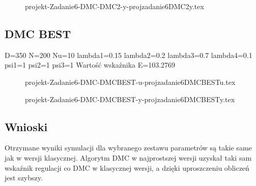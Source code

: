 \ifdefined\CompileFigures
    \begin{figure}[H] 
            \centering
            
            \caption{projekt-Zadanie6-DMC-DMC2-y-projzadanie6DMC2y.tex}
            \label{projekt:zad6:figure:projzadanie6DMC2y}
    \end{figure}
\fi

\subsection{DMC BEST}
D=350 N=200 Nu=10 
lambda1=0.15 lambda2=0.2 lambda3=0.7 lambda4=0.1 
psi1=1 psi2=1 psi3=1 
Wartość wskaźnika E=103.2769


\ifdefined\CompileFigures
    \begin{figure}[H] 
            \centering
            
            \caption{projekt-Zadanie6-DMC-DMCBEST-u-projzadanie6DMCBESTu.tex}
            \label{projekt:zad6:figure:projzadanie6DMCBESTu}
    \end{figure}
\fi


\ifdefined\CompileFigures
    \begin{figure}[H] 
            \centering
            
            \caption{projekt-Zadanie6-DMC-DMCBEST-y-projzadanie6DMCBESTy.tex}
            \label{projekt:zad6:figure:projzadanie6DMCBESTy}
    \end{figure}
\fi

\subsection{Wnioski}

Otrzymane wyniki symulacji dla wybranego zestawu parametrów są takie same jak w
wersji klasycznej.
\newline
Algorytm DMC w najprostszej wersji uzyskał taki sam wskaźnik regulacji co
DMC w klasycznej wersji, a dzięki uproszczeniu obliczeń jest szybszy.


\newpage
